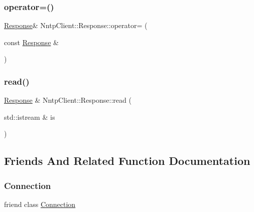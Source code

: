 \hypertarget{class_nntp_client_1_1_response_a158dfd4073aa9668894bbf230ed069a4}{}\label{class_nntp_client_1_1_response_a158dfd4073aa9668894bbf230ed069a4} 
\subsubsection{\texorpdfstring{operator=()}{operator=()}}
{\footnotesize\ttfamily \hyperlink{class_nntp_client_1_1_response}{Response}\& Nntp\+Client\+::\+Response\+::operator= (\begin{DoxyParamCaption}\item[{const \hyperlink{class_nntp_client_1_1_response}{Response} \&}]{ }\end{DoxyParamCaption})\hspace{0.3cm}{\ttfamily [default]}}

\hypertarget{class_nntp_client_1_1_response_a62232211988726cc0c37860b50897131}{}\label{class_nntp_client_1_1_response_a62232211988726cc0c37860b50897131} 
\subsubsection{\texorpdfstring{read()}{read()}}
{\footnotesize\ttfamily \hyperlink{class_nntp_client_1_1_response}{Response} \& Nntp\+Client\+::\+Response\+::read (\begin{DoxyParamCaption}\item[{std\+::istream \&}]{is }\end{DoxyParamCaption})}



\subsection{Friends And Related Function Documentation}
\hypertarget{class_nntp_client_1_1_response_a54a11fdc71e1679a42fa0c0e3856673d}{}\label{class_nntp_client_1_1_response_a54a11fdc71e1679a42fa0c0e3856673d} 
\subsubsection{\texorpdfstring{Connection}{Connection}}
{\footnotesize\ttfamily friend class \hyperlink{class_nntp_client_1_1_connection}{Connection}\hspace{0.3cm}{\ttfamily [friend]}}



